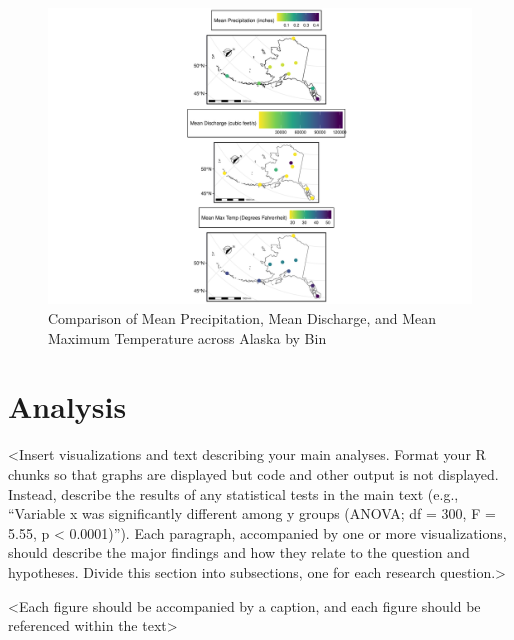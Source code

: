 \documentclass[12pt,]{article}
\begin{document}
\begin{figure}
\centering
\includegraphics{Project_Report_v2_files/figure-latex/unnamed-chunk-8-1.pdf}
\caption{Comparison of Mean Precipitation, Mean Discharge, and Mean
Maximum Temperature across Alaska by Bin}
\end{figure}

\hypertarget{analysis}{%
\section{Analysis}\label{analysis}}

\textless{}Insert visualizations and text describing your main analyses.
Format your R chunks so that graphs are displayed but code and other
output is not displayed. Instead, describe the results of any
statistical tests in the main text (e.g., ``Variable x was significantly
different among y groups (ANOVA; df = 300, F = 5.55, p \textless{}
0.0001)''). Each paragraph, accompanied by one or more visualizations,
should describe the major findings and how they relate to the question
and hypotheses. Divide this section into subsections, one for each
research question.\textgreater{}

\textless{}Each figure should be accompanied by a caption, and each
figure should be referenced within the text\textgreater{}
\end{document}
